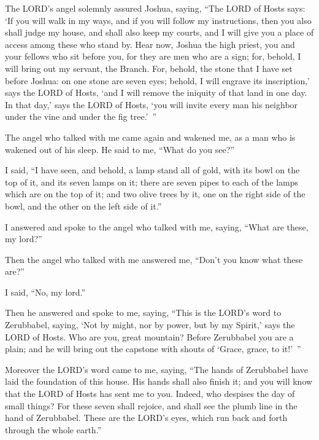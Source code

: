 \myverse{}The LORD’s angel solemnly assured Joshua, saying,
\myverse{}“The LORD of Hosts says: ‘If you will walk in my ways, and if you will follow
my instructions, then you also shall judge my house, and shall also keep my courts, and I will give you
a place of access among these who stand by.
\myverse{}Hear now, Joshua the high priest, you and your fellows who sit before you, for
they are men who are a sign; for, behold, I will bring out my servant, the Branch.
\myverse{}For, behold, the stone that I have set before Joshua: on one stone are seven
eyes; behold, I will engrave its inscription,’ says the LORD of Hosts, ‘and I will remove the iniquity
of that land in one day.
\myverse{}In that day,’ says the LORD of Hosts, ‘you will invite every man his neighbor
under the vine and under the fig tree.’ ”


\mychapter{} \myverse*{}The angel who talked with me came again and wakened me, as a man
who is wakened out of his sleep.
\myverse{}He said to me, “What do you see?”

I said, “I have seen, and behold, a lamp stand all of gold, with its bowl on the top of it,
and its seven lamps on it; there are seven pipes to each of the lamps which are on the top of it;
\myverse{}and two olive trees by it, one on the right side of the bowl, and the other
on the left side of it.”

\myverse{}I answered and spoke to the angel who talked with me, saying, “What
are these, my lord?”

\myverse{}Then the angel who talked with me answered me, “Don’t you know
what these are?”

I said, “No, my lord.”

\myverse{}Then he answered and spoke to me, saying, “This is the LORD’s word
to Zerubbabel, saying, ‘Not by might, nor by power, but by my Spirit,’ says the LORD of Hosts.
\myverse{}Who are you, great mountain? Before Zerubbabel you are a plain; and he will
bring out the capstone with shouts of ‘Grace, grace, to it!’ ”

\myverse{}Moreover the LORD’s word came to me, saying,
\myverse{}“The hands of Zerubbabel have laid the foundation of this house. His hands shall
also finish it; and you will know that the LORD of Hosts has sent me to you.
\myverse{}Indeed, who despises the day of small things? For these seven shall rejoice,
and shall see the plumb line in the hand of Zerubbabel. These are the LORD’s eyes, which run back and
forth through the whole earth.”

